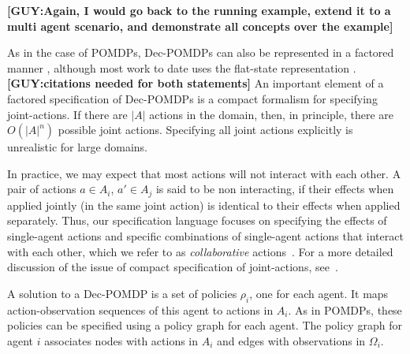 \documentclass[letterpaper]{article} %
\newcommand{\eliran}[1]{\textbf{[\color{red}ELIRAN:#1]}}
\newcommand{\guy}[1]{\textbf{[\color{orange}GUY:#1]}}
\begin{document}
\guy{Again, I would go back to the running example, extend it to a multi agent scenario, and demonstrate all concepts over the example}

As in the case of POMDPs, Dec-POMDPs can also be represented in a factored manner \cite{}, although most work to date uses the flat-state representation \cite{}.\guy{citations needed for both statements}
An important element of a factored specification of Dec-POMDPs is a compact formalism for specifying joint-actions. If there are $|A|$ actions in the domain, then, in principle, there are $O(|A|^n)$ possible joint actions. Specifying all joint actions explicitly is unrealistic for large domains. 

In practice, we may expect
that most actions will not interact with each other. A pair of actions $a\in A_i$, $a' \in A_j$ is said to be non interacting, if their effects when applied jointly (in the same joint action) is identical to their effects when applied separately.
Thus, our specification language focuses on specifying
the effects of single-agent actions and specific
combinations of single-agent actions that interact with each other, which we refer to as {\em collaborative} actions~\cite{}. For a more detailed discussion of the issue
of compact specification of joint-actions, see~\cite{}. 


A solution to a Dec-POMDP is a set of policies $\rho_i$, one for each agent. It maps action-observation sequences of this agent to actions in $A_i$.
As in POMDPs, these policies can be specified using a policy graph for each agent. The policy graph for agent $i$ associates nodes with actions in $A_i$
and edges with observations in $\Omega_i$. 

\end{document}
